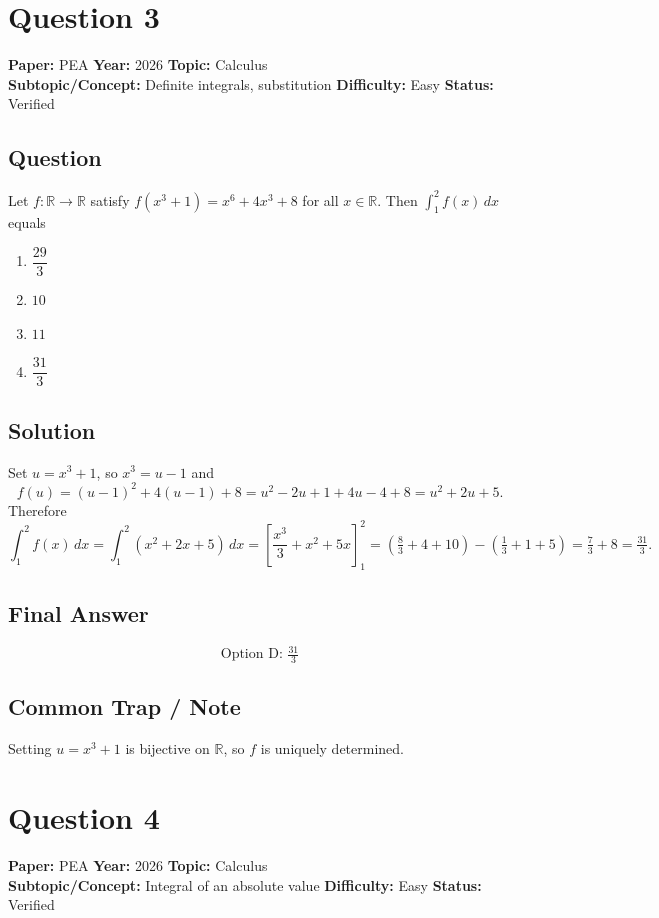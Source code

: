 \documentclass[11pt]{article}
\begin{document}
\section*{Question 3}
\textbf{Paper:} PEA \quad \textbf{Year:} 2026 \quad \textbf{Topic:} Calculus \\
\textbf{Subtopic/Concept:} Definite integrals, substitution \quad
\textbf{Difficulty:} Easy \quad \textbf{Status:} Verified

\subsection*{Question}
Let $f:\mathbb{R}\to\mathbb{R}$ satisfy $f(x^3+1) = x^6 + 4x^3 + 8$ for all
$x \in \mathbb{R}$. Then $\displaystyle \int_1^2 f(x)\,dx$ equals
\begin{enumerate}[label=(\Alph*)]
\item $\dfrac{29}{3}$ \item $10$ \item $11$ \item $\dfrac{31}{3}$
\end{enumerate}

\subsection*{Solution}
Set $u = x^3 + 1$, so $x^3 = u - 1$ and
\[
f(u) = (u-1)^2 + 4(u-1) + 8 = u^2 - 2u + 1 + 4u - 4 + 8 = u^2 + 2u + 5.
\]
Therefore
\[
\int_1^2 f(x)\,dx = \int_1^2 (x^2 + 2x + 5)\,dx
= \left[\frac{x^3}{3} + x^2 + 5x\right]_1^2
= \left(\tfrac{8}{3} + 4 + 10\right) - \left(\tfrac{1}{3} + 1 + 5\right)
= \tfrac{7}{3} + 8 = \tfrac{31}{3}.
\]

\subsection*{Final Answer}
\[
\boxed{\text{Option D: } \tfrac{31}{3}}
\]

\subsection*{Common Trap / Note}
Setting $u = x^3 + 1$ is bijective on $\mathbb{R}$, so $f$ is uniquely determined.

\section*{Question 4}
\textbf{Paper:} PEA \quad \textbf{Year:} 2026 \quad \textbf{Topic:} Calculus \\
\textbf{Subtopic/Concept:} Integral of an absolute value \quad
\textbf{Difficulty:} Easy \quad \textbf{Status:} Verified
\end{document}
